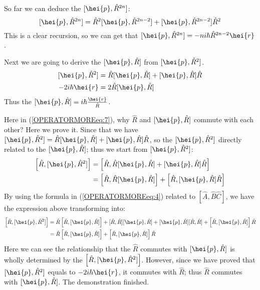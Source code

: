 So far we can deduce the $[\hei{p}, \hat{R}^{2n}]$:
\begin{equation}\label{}
[\hei{p}, \hat{R}^{2n}] = \hat{R}^{2}[\hei{p}, \hat{R}^{2n-2}] +
[\hei{p}, \hat{R}^{2n-2}]\hat{R}^{2}
\end{equation}
This is a clear recursion, so we can get that $[\hei{p},
\hat{R}^{2n}] = -ni\hbar\hat{R}^{2n-2}\hei{r}$.

Next we are going to derive the $[\hei{p}, \hat{R}]$ from $[\hei{p},
\hat{R}^{2}]$.
\begin{align}\label{OPERATORMOREeq:7}
[\hei{p}, \hat{R}^{2}] &= \hat{R}[\hei{p}, \hat{R}]+ [\hei{p},
\hat{R}]\hat{R} \nonumber \\
-2i\hbar\hei{r} &= 2\hat{R}[\hei{p}, \hat{R}]
\end{align}
Thus the $[\hei{p}, \hat{R}] =i\hbar\frac{\hei{r}}{\hat{R}}$.

Here in (\ref{OPERATORMOREeq:7}), why $\hat{R}$ and $[\hei{p},
\hat{R}]$ commute with each other? Here we prove it. Since that we
have $[\hei{p},\hat{R}^{2}] = \hat{R}[\hei{p}, \hat{R}]+ [\hei{p},
\hat{R}]\hat{R}$, so the $[\hei{p},\hat{R}^{2}]$ directly related to
the $[\hei{p}, \hat{R}]$; thus we start from
$[\hei{p},\hat{R}^{2}]$:
\begin{align}\label{}
\left[\hat{R}, [\hei{p},\hat{R}^{2}]\right] &= \left[\hat{R},
\hat{R}[\hei{p},
\hat{R}]+ [\hei{p}, \hat{R}]\hat{R}\right] \nonumber \\
&=\left[\hat{R}, \hat{R}[\hei{p}, \hat{R}]\right]+ \left[\hat{R},
[\hei{p}, \hat{R}]\hat{R}\right]
\end{align}
By using the formula in (\ref{OPERATORMOREeq:4}) related to
$[\hat{A}, \hat{B}\hat{C}]$, we have the expression above
transforming into:
\begin{align}\label{}
\left[\hat{R}, [\hei{p},\hat{R}^{2}]\right] &=
\hat{R}\left[\hat{R},[\hei{p}, \hat{R}] \right] + [\hat{R},
\hat{R}][\hei{p}, \hat{R}] + [\hei{p}, \hat{R}][\hat{R}, \hat{R}] +
\left[\hat{R},[\hei{p}, \hat{R}] \right]\hat{R} \nonumber \\
&=\hat{R}\left[\hat{R},[\hei{p}, \hat{R}] \right]+
\left[\hat{R},[\hei{p}, \hat{R}] \right]\hat{R}
\end{align}
Here we can see the relationship that the $\hat{R}$ commutes with
$[\hei{p}, \hat{R}]$ is wholly determined by the $\left[\hat{R},
[\hei{p},\hat{R}^{2}]\right]$. However, since we have proved that
$[\hei{p},\hat{R}^{2}]$ equals to $-2i\hbar\hei{r}$, it commutes
with $\hat{R}$; thus $\hat{R}$ commutes with $[\hei{p}, \hat{R}]$.
The demonstration finished.

